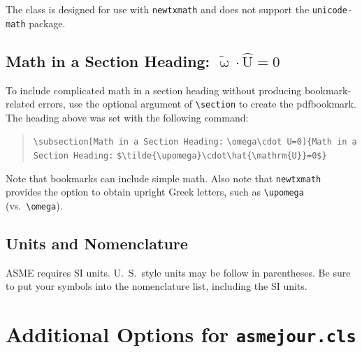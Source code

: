 \documentclass[subscriptcorrection,upint,varvw,mathalfa=cal=euler,barcolor=black,balance,hyphenate,french,pdf-a,nolists]{asmejour}
\begin{document}
The class is designed for use with \texttt{newtxmath} and does not support the \texttt{unicode-math} package.

\subsection[Math in a Section Heading: \omega\cdot U=0]{Math in a Section Heading: $\tilde{\upomega}\cdot\hat{\mathrm{U}}=0$}

To include complicated math in a section heading without producing bookmark-related errors, use the optional argument of \verb|\section| to create the pdfbookmark. The heading above was set with the following command:
\begin{quote}\raggedright
\verb|\subsection[Math in a Section Heading:|
\hspace*{1em}\verb|\omega\cdot U=0]{Math in a Section Heading:|
\hspace*{1em}\verb|$\tilde{\upomega}\cdot\hat{\mathrm{U}}=0$}|
\end{quote}
Note that bookmarks can include simple math. Also note that \texttt{newtxmath} provides the option to obtain upright Greek letters, such as \verb|\upomega| (vs.\ \verb|\omega|).


\subsection{Units and Nomenclature} ASME requires SI units. U.~S.\ style units may be follow in parentheses. Be sure to put your symbols into the nomenclature list, including the SI units.


\section{Additional Options for \texttt{asmejour.cls}}
\end{document}
